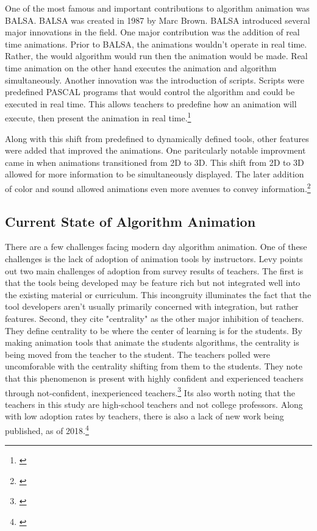 \documentclass[12pt,twoside]{reedthesis}
\begin{document}
One of the most famous and important contributions to algorithm animation was BALSA. BALSA was created in 1987 by Marc Brown. BALSA introduced several major innovations in the field. One major contribution was the addition of real time animations. Prior to BALSA, the animations wouldn't operate in real time. Rather, the would algorithm would run then the animation would be made. Real time animation on the other hand executes the animation and algorithm simultaneously. Another innovation was the introduction of scripts. Scripts were predefined PASCAL programs that would control the algorithm and could be executed in real time. This allows teachers to predefine how an animation will execute, then present the animation in real time.\footnote{\cite{brown_algorithm_1987}}

Along with this shift from predefined to dynamically defined tools, other features were added that improved the animations. One paritcularly notable improvment came in when animations transitioned from 2D to 3D. This shift from 2D to 3D allowed for more information to be simultaneously displayed. The later addition of color and sound allowed animations even more avenues to convey information.\footnote{\cite{najork_library_1994}}

\subsection{Current State of Algorithm Animation}
There are a few challenges facing modern day algorithm animation. One of these challenges is the lack of adoption of animation tools by instructors. Levy points out two main challenges of adoption from survey results of teachers. The first is that the tools being developed may be feature rich but not integrated well into the existing material or curriculum. This incongruity illuminates the fact that the tool developers aren't usually primarily concerned with integration, but rather features. Second, they cite "centrality" as the other major inhibition of teachers. They define centrality to be 	where the center of learning is for the students. By making animation tools that animate the students algorithms, the centrality is being moved from the teacher to the student. The teachers polled were uncomforable with the centrality shifting from them to the students. They note that this phenomenon is present with highly confident and experienced teachers through not-confident, inexperienced teachers.\footnote{\cite{levy_we_2007}}  Its also worth noting that the teachers in this study are high-school teachers and not college professors. Along with low adoption rates by teachers, there is also a lack of new work being published, as of 2018.\footnote{\cite{kucera_visualization_2018}}  
\end{document}
